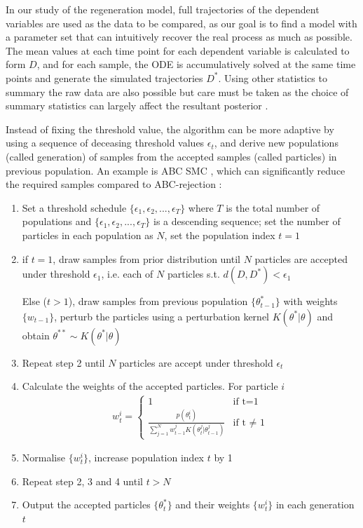 In our study of the regeneration model, full trajectories of the dependent variables are used as the data to be compared, as our goal is to find a model with a parameter set that can intuitively recover the real process as much as possible. The mean values at each time point for each dependent variable is calculated to form $D$, and for each sample, the ODE is accumulatively solved at the same time points and generate the simulated trajectories $D^*$. Using other statistics to summary the raw data are also possible but care must be taken as the choice of summary statistics can largely affect the resultant posterior \cite{summaryD, summaryD2}.

Instead of fixing the threshold value, the algorithm can be more adaptive by using a sequence of deceasing threshold values $\epsilon_t$, and derive new populations (called generation) of samples from the accepted samples (called particles) in previous population. An example is ABC SMC \cite{Toni}, which can significantly reduce the required samples compared to ABC-rejection \cite{ref:disease}:

\begin{enumerate}
    \item Set a threshold schedule $\{\epsilon_1, \epsilon_2, ..., \epsilon_T\}$ where $T$ is the total number of populations and $\{\epsilon_1, \epsilon_2, ..., \epsilon_T\}$ is a descending sequence; set the number of particles in each population as $N$, set the population index $t=1$
    \item if $t=1$, draw samples from prior distribution until $N$ particles are accepted under threshold $\epsilon_1$, i.e. each of $N$ particles s.t. $d(D,D^*)<\epsilon_1$
    
    Else ($t>1$), draw samples from previous population $\{\theta^*_{t-1}\}$ with weights $\{w_{t-1}\}$, perturb the particles using a perturbation kernel $K(\theta^*|\theta)$ and obtain $\theta^{**}\sim K(\theta^*|\theta)$
    \item Repeat step 2 until $N$ particles are accept under threshold $\epsilon_t$
    \item Calculate the weights of the accepted particles. For particle $i$ 
    \begin{align}
        \label{eq:weight}
        w^i_t =\begin{cases}
            1 & \text{if t=1} \\
            \frac{p(\theta^i_t)}{\sum_{j=1}^{N} w^j_{t-1}K(\theta^j_t|\theta^j_{t-1})} & \text{if t $\neq$ 1} 
        \end{cases}
    \end{align}
    
    \item Normalise $\{w^i_t\}$, increase population index $t$ by 1
    \item Repeat step 2, 3 and 4 until $t>N$
    \item Output the accepted particles $\{\theta^*_{t}\}$ and their weights $\{w^i_t\}$ in each generation $t$

\end{enumerate}

